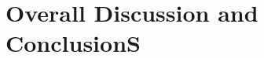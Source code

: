 \documentclass[12pt,twoside,openright,a4paper]{report}
\begin{document}
\setcounter{chapter}{3}
\chapter{Overall Discussion and ConclusionS} \label{c:concs}



\end{document}
